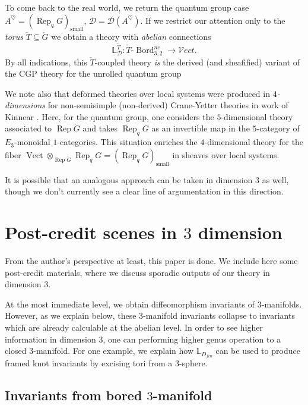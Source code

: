 \documentclass[reqno]{amsart}
\theoremstyle{definition}
\newcommand{\mbb}[1]{\mathbb{#1}}
\newcommand{\msc}[1]{\mathscr{#1}}
\newcommand{\opn}[1]{\operatorname{#1}}
\newcommand{\ot}{\otimes}
\newcommand{\Vect}{\msc{V}\!ect}
\DeclareMathOperator{\Rep}{Rep}
\DeclareMathOperator{\Bord}{Bord}
\renewcommand{\1}{\mathbf{1}}
\begin{document}
To come back to the real world, we return the quantum group case $A^{\heartsuit}=(\Rep_qG)_{\opn{small}}$, $\msc{D}=\msc{D}(A^{\heartsuit})$.  If we restrict our attention only to the \emph{torus} $\check{T}\subseteq \check{G}$ we obtain a theory with \emph{abelian} connections
\[
\mbb{L}^{\check{T}}_{\msc{D}}:\check{T}\text{-}\Bord_{3,2}^{nc}\to \Vect.
\]
By all indications, this $\check{T}$-coupled theory \emph{is} the derived (and sheafified) variant of the CGP theory for the unrolled quantum group \cite{blanchetetal16,derenzigeermirand20}
\par

We note also that deformed theories over local systems were produced in \emph{$4$-dimensions} for non-semisimple (non-derived) Crane-Yetter theories in work of Kinnear \cite{kinnear}. Here, for the quantum group, one considers the $5$-dimensional theory associated to $\Rep\check{G}$ and takes $\Rep_qG$ as an invertible map in the $5$-category of $E_3$-monoidal $1$-categories. This situation enriches the $4$-dimensional theory for the fiber $\opn{Vect}\ot_{\Rep\check{G}}\Rep_qG=(\Rep_qG)_{\opn{small}}$ in sheaves over local systems.

It is possible that an analogous approach can be taken in dimension $3$ as well, though we don't currently see a clear line of argumentation in this direction.



\section{Post-credit scenes in $3$ dimension}
\label{sect:dimension_3}

From the author's perspective at least, this paper is done. We include here some post-credit materials, where we discuss sporadic outputs of our theory in dimension $3$.
\par

At the most immediate level, we obtain diffeomorphism invariants of $3$-manifolds. However, as we explain below, these $3$-manifold invariants collapse to invariants which are already calculable at the abelian level.  In order to see higher information in dimension $3$, one can performing higher genus operation to a closed $3$-manifold.  For one example, we explain how $\mbb{L}_{D_{fin}}$ can be used to produce framed knot invariants by excising tori from a $3$-sphere.


\subsection{Invariants from bored $3$-manifold}
\end{document}
